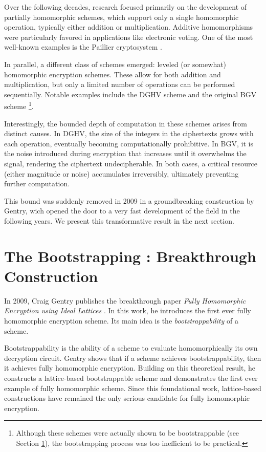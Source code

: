 Over the following decades, research focused primarily on the development of partially homomorphic schemes, which support only a single homomorphic operation, typically either addition or multiplication. Additive homomorphisms were particularly favored in applications like electronic voting. One of the most well-known examples is the Paillier cryptosystem \cite{EC:Paillier99}.

In parallel, a different class of schemes emerged: leveled (or somewhat) homomorphic encryption schemes. These allow for both addition and multiplication, but only a limited number of operations can be performed sequentially. Notable examples include the DGHV scheme \cite{EC:DGHV10} and the original BGV scheme \cite{bgv}\footnote{Although these schemes were actually shown to be bootstrappable (see Section \ref{sec:gentry_bootstrapping}), the bootstrapping process was too inefficient to be practical.}.

Interestingly, the bounded depth of computation in these schemes arises from distinct causes. In DGHV, the size of the integers in the ciphertexts grows with each operation, eventually becoming computationally prohibitive. In BGV, it is the noise introduced during encryption that increases until it overwhelms the signal, rendering the ciphertext undecipherable. In both cases, a critical resource (either magnitude or noise) accumulates irreversibly, ultimately preventing further computation.

This bound was suddenly removed in 2009 in a groundbreaking construction by Gentry, wich opened the door to a very fast development of the field in the following years. We present this transformative result in the next section.

\section{The Bootstrapping : Breakthrough Construction}
\label{sec:gentry_bootstrapping}


In 2009, Craig Gentry publishes the breakthrough paper \textit{Fully Homomorphic Encryption using Ideal Lattices} \cite{STOC:Gentry09}. In this work, he introduces the first ever fully homomorphic encryption scheme. Its main idea is the \textit{bootstrappability} of a scheme.

Bootstrappability is the ability of a scheme to evaluate homomorphically its own decryption circuit. Gentry shows that if a scheme achieves bootstrappability, then it achieves fully homomorphic encryption. Building on this theoretical result, he constructs a lattice-based bootstrappable scheme and demonstrates the first ever example of fully homomorphic scheme. Since this foundational work, lattice-based constructions have remained the only serious candidate for fully homomorphic encryption. 

